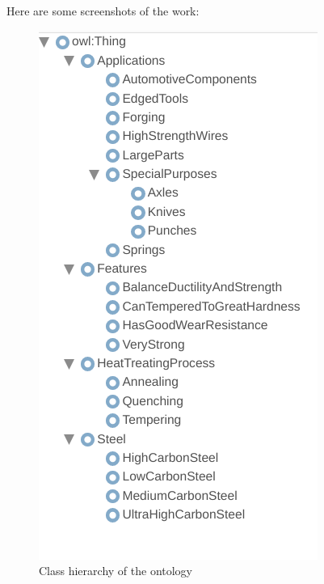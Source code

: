 \documentclass[12pt]{article}
\begin{document}
{Here are some screenshots of the work:
\begin{figure}[ht]
	\centering
	\includegraphics[scale=0.4]{figs/ex8-class-hierarchy.png}
	\caption{Class hierarchy of the ontology}
	\label{fig:label9}
\end{figure}
\begin{figure}[ht]
	\centering
\end{figure}}
\end{document}
